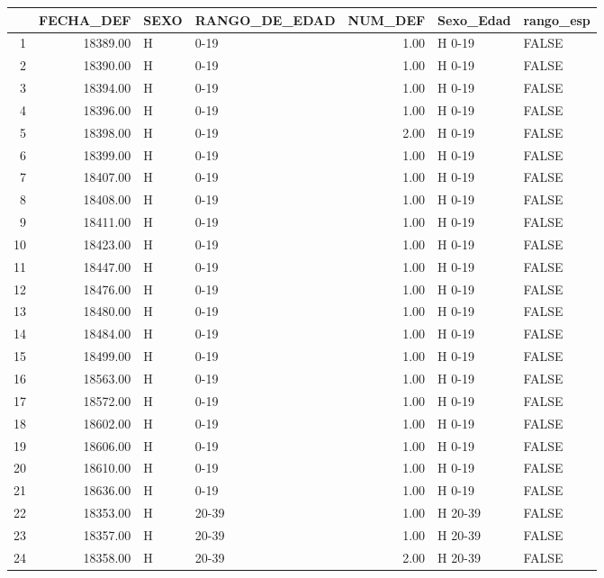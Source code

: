 \begin{table}[ht]
\centering
\begin{tabular}{rrllrll}
  \hline
 & FECHA\_DEF & SEXO & RANGO\_DE\_EDAD & NUM\_DEF & Sexo\_Edad & rango\_esp \\ 
  \hline
1 & 18389.00 & H & 0-19 & 1.00 & H 0-19 & FALSE \\ 
  2 & 18390.00 & H & 0-19 & 1.00 & H 0-19 & FALSE \\ 
  3 & 18394.00 & H & 0-19 & 1.00 & H 0-19 & FALSE \\ 
  4 & 18396.00 & H & 0-19 & 1.00 & H 0-19 & FALSE \\ 
  5 & 18398.00 & H & 0-19 & 2.00 & H 0-19 & FALSE \\ 
  6 & 18399.00 & H & 0-19 & 1.00 & H 0-19 & FALSE \\ 
  7 & 18407.00 & H & 0-19 & 1.00 & H 0-19 & FALSE \\ 
  8 & 18408.00 & H & 0-19 & 1.00 & H 0-19 & FALSE \\ 
  9 & 18411.00 & H & 0-19 & 1.00 & H 0-19 & FALSE \\ 
  10 & 18423.00 & H & 0-19 & 1.00 & H 0-19 & FALSE \\ 
  11 & 18447.00 & H & 0-19 & 1.00 & H 0-19 & FALSE \\ 
  12 & 18476.00 & H & 0-19 & 1.00 & H 0-19 & FALSE \\ 
  13 & 18480.00 & H & 0-19 & 1.00 & H 0-19 & FALSE \\ 
  14 & 18484.00 & H & 0-19 & 1.00 & H 0-19 & FALSE \\ 
  15 & 18499.00 & H & 0-19 & 1.00 & H 0-19 & FALSE \\ 
  16 & 18563.00 & H & 0-19 & 1.00 & H 0-19 & FALSE \\ 
  17 & 18572.00 & H & 0-19 & 1.00 & H 0-19 & FALSE \\ 
  18 & 18602.00 & H & 0-19 & 1.00 & H 0-19 & FALSE \\ 
  19 & 18606.00 & H & 0-19 & 1.00 & H 0-19 & FALSE \\ 
  20 & 18610.00 & H & 0-19 & 1.00 & H 0-19 & FALSE \\ 
  21 & 18636.00 & H & 0-19 & 1.00 & H 0-19 & FALSE \\ 
  22 & 18353.00 & H & 20-39 & 1.00 & H 20-39 & FALSE \\ 
  23 & 18357.00 & H & 20-39 & 1.00 & H 20-39 & FALSE \\ 
  24 & 18358.00 & H & 20-39 & 2.00 & H 20-39 & FALSE \\ 

\end{tabular}
\end{table}
